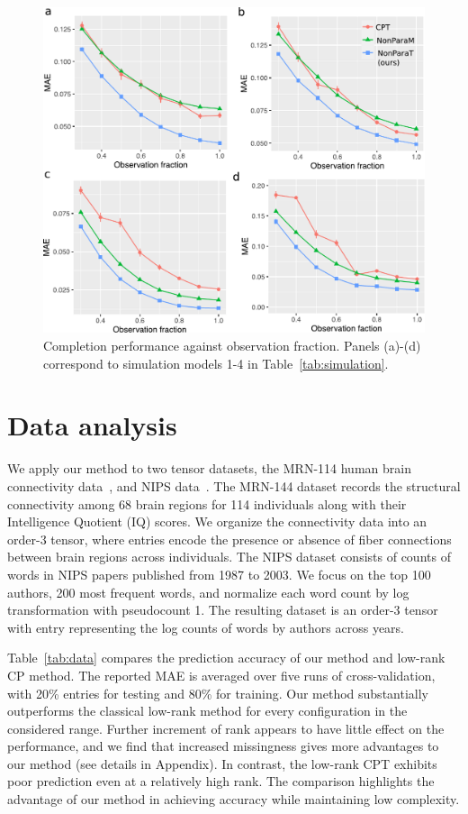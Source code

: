 \documentclass{article}
\theoremstyle{plain}
\theoremstyle{definition}
\begin{document}
\begin{figure}[H]
\vspace{-.1cm}
\includegraphics[width=.45\textwidth]{figure/fig5-8.pdf}
\caption{Completion performance against observation fraction. Panels (a)-(d) correspond to simulation models 1-4 in Table~\ref{tab:simulation}. }\label{fig:compare2}
\vspace{-.4cm}
\end{figure}

\section{Data analysis}
We apply our method to two tensor datasets, the MRN-114 human brain connectivity data~\citep{wang2017bayesian}, and NIPS data~\cite{globerson2007euclidean}. The MRN-144 dataset records the structural connectivity among 68 brain regions for 114 individuals along with their Intelligence Quotient (IQ) scores. We organize the connectivity data into an order-3 tensor, where entries encode the presence or absence of fiber connections between brain regions across individuals. The NIPS dataset consists of counts of words in NIPS papers published from 1987 to 2003. We focus on the top 100 authors, 200 most frequent words, and normalize each word count by log transformation with pseudocount 1. The resulting dataset is an order-3 tensor with entry representing the log counts of words by authors across years. 

Table~\ref{tab:data} compares the prediction accuracy of our method and low-rank CP method. The reported MAE is averaged over five runs of cross-validation, with 20\% entries for testing and 80\% for training. Our method substantially outperforms the classical low-rank method for every configuration in the considered range. Further increment of rank appears to have little effect on the performance, and we find that increased missingness gives more advantages to our method (see details in Appendix). In contrast, the low-rank CPT exhibits poor prediction even at a relatively high rank. The comparison highlights the advantage of our method in achieving accuracy while maintaining low complexity. 
\end{document}
